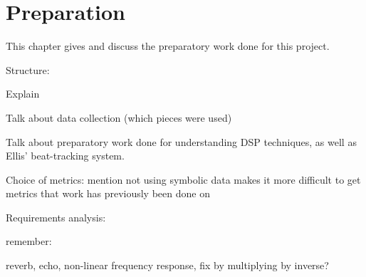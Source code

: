 \documentclass[oneside, class=book, 12pt, crop=false]{standalone}
\begin{document}
\ifstandalone
  \setcounter{chapter}{1}
  \chapter{Preparation}
\fi
{}

This chapter gives and discuss the preparatory work done for this project.

Structure:

Explain 

Talk about data collection (which pieces were used)

Talk about preparatory work done for understanding DSP techniques, as well as Ellis' beat-tracking system.

Choice of metrics: mention not using symbolic data makes it more difficult to get metrics that work has previously been done on

Requirements analysis:


remember:

reverb, echo, non-linear frequency response, fix by multiplying by inverse?




\ifstandalone
  \printbibliography
\fi
    
\end{document}

